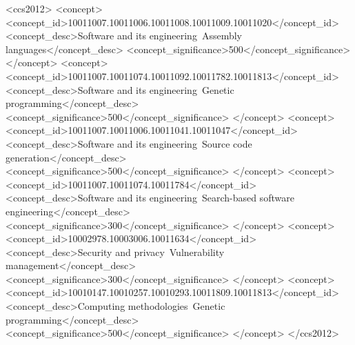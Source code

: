 \documentclass[dvipsnames, format=sigconf]{acmart}
\begin{document}
\begin{CCSXML}
<ccs2012>
   <concept>
       <concept_id>10011007.10011006.10011008.10011009.10011020</concept_id>
       <concept_desc>Software and its engineering~Assembly languages</concept_desc>
       <concept_significance>500</concept_significance>
       </concept>
   <concept>
       <concept_id>10011007.10011074.10011092.10011782.10011813</concept_id>
       <concept_desc>Software and its engineering~Genetic programming</concept_desc>
       <concept_significance>500</concept_significance>
       </concept>
   <concept>
       <concept_id>10011007.10011006.10011041.10011047</concept_id>
       <concept_desc>Software and its engineering~Source code generation</concept_desc>
       <concept_significance>500</concept_significance>
       </concept>
   <concept>
       <concept_id>10011007.10011074.10011784</concept_id>
       <concept_desc>Software and its engineering~Search-based software engineering</concept_desc>
       <concept_significance>300</concept_significance>
       </concept>
   <concept>
       <concept_id>10002978.10003006.10011634</concept_id>
       <concept_desc>Security and privacy~Vulnerability management</concept_desc>
       <concept_significance>300</concept_significance>
       </concept>
   <concept>
       <concept_id>10010147.10010257.10010293.10011809.10011813</concept_id>
       <concept_desc>Computing methodologies~Genetic programming</concept_desc>
       <concept_significance>500</concept_significance>
       </concept>
 </ccs2012>
\end{CCSXML}




\end{document}

